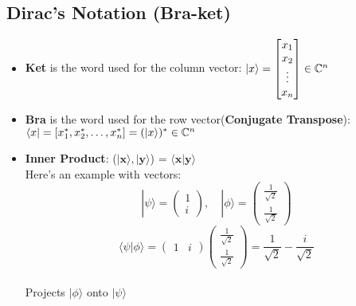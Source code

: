 \documentclass{report}
\begin{document}
\subsection{Dirac's Notation (Bra-ket)}
\begin{itemize}
    \item \textbf{Ket} is the word used for the column vector: $\ket{x} = \begin{bmatrix}
        x_{1} \\
        x_{2} \\
        \vdots \\
        x_{n}
    \end{bmatrix} \in \mathbb{C}^{n}$

    \item \textbf{Bra} is the word used for the row vector(\textbf{Conjugate Transpose}): $\bra{x} = [x_{1}^*, x_{2}^*, \dots, x_{n}^*] = (\ket{x})^* \in \mathbb{C}^n$
    
    \item \textbf{Inner Product}: ($|\mathbf{x} \rangle, |\mathbf{y} \rangle$) = $\langle \mathbf{x} | \mathbf{y} \rangle$\\
    Here's an example with vectors:
\[
|\psi\rangle = \begin{pmatrix} 1 \\ i \end{pmatrix}, \quad |\phi\rangle = \begin{pmatrix} \frac{1}{\sqrt{2}} \\ \frac{1}{\sqrt{2}} \end{pmatrix}
\]
\[
\langle \psi | \phi \rangle = \begin{pmatrix} 1 & i \end{pmatrix} \begin{pmatrix} \frac{1}{\sqrt{2}} \\ \frac{1}{\sqrt{2}} \end{pmatrix} = \frac{1}{\sqrt{2}} - \frac{i}{\sqrt{2}}
\] \\
Projects $| \phi \rangle$ onto $| \psi \rangle$


\end{itemize}
\end{document}
